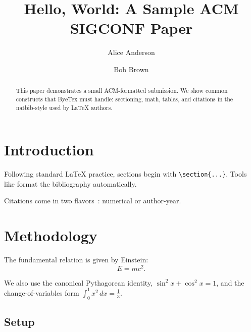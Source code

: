 \documentclass[sigconf]{acmart}
\begin{document}
\title{Hello, World: A Sample ACM SIGCONF Paper}

\author{Alice Anderson}

\author{Bob Brown}

\renewcommand{\shortauthors}{Anderson and Brown}

\begin{abstract}
This paper demonstrates a small ACM-formatted submission. We show common
constructs that ByeTex must handle: sectioning, math, tables, and citations
in the natbib-style used by \LaTeX{} authors.
\end{abstract}


\maketitle

\section{Introduction}

Following standard \LaTeX{} practice, sections begin with \verb|\section{...}|.
Tools like \BibTeX{} format the bibliography automatically.

Citations come in two flavors~\cite{bohr}: numerical or author-year.

\section{Methodology}

The fundamental relation is given by Einstein:
\begin{equation}
E = mc^2.
\label{eq:einstein}
\end{equation}

We also use the canonical Pythagorean identity, $\sin^2 x + \cos^2 x = 1$, and
the change-of-variables form $\int_0^1 x^2 \, dx = \frac{1}{3}$.

\subsection{Setup}
\end{document}
